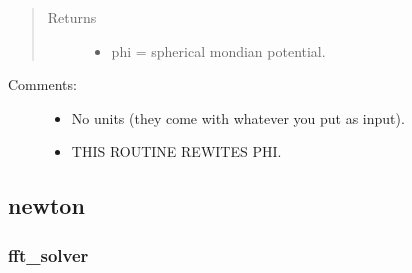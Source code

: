 \documentclass[letterpaper,10pt,english]{sphinxmanual}
\begin{document}
\begin{fulllineitems}
\begin{quote}
\begin{description}
\begin{itemize}
\end{itemize}

\item[{Returns}] \leavevmode
\begin{itemize}
\item {} 
phi = spherical mondian potential.

\end{itemize}


\end{description}\end{quote}
\begin{description}
\item[{Comments:}] \leavevmode\begin{itemize}
\item {} 
No units (they come with whatever you put as input).

\item {} 
THIS ROUTINE REWITES PHI.

\end{itemize}

\end{description}

\end{fulllineitems}



\subsection{newton}
\label{\detokenize{sphinx-c-apidoc/output/gravity/newton/newton:newton}}\label{\detokenize{sphinx-c-apidoc/output/gravity/newton/newton::doc}}

\subsubsection{fft\_solver}
\label{\detokenize{sphinx-c-apidoc/output/gravity/newton/fft_solver/fft_solver:fft-solver}}\label{\detokenize{sphinx-c-apidoc/output/gravity/newton/fft_solver/fft_solver::doc}}
\end{document}
